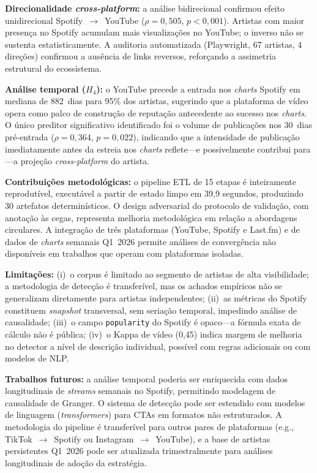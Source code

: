 ﻿\documentclass[12pt]{article}
\begin{document}
\textbf{Direcionalidade \textit{cross-platform}:} a análise bidirecional
confirmou efeito unidirecional Spotify~$\to$~YouTube ($\rho = 0{,}505$,
$p < 0{,}001$). Artistas com maior presença no Spotify acumulam mais
visualizações no YouTube; o inverso não se sustenta estatisticamente. A
auditoria automatizada (Playwright, 67 artistas, 4 direções) confirmou a
ausência de links reversos, reforçando a assimetria estrutural do ecossistema.

\textbf{Análise temporal ($H_4$):} o YouTube precede a entrada nos
\textit{charts} Spotify em mediana de 882~dias para 95\% dos artistas,
sugerindo que a plataforma de vídeo opera como palco de construção de
reputação antecedente ao sucesso nos \textit{charts}. O único preditor
significativo identificado foi o volume de publicações nos 30~dias
pré-entrada ($\rho = 0{,}364$, $p = 0{,}022$), indicando que a intensidade
de publicação imediatamente antes da estreia nos \textit{charts} reflete---e
possivelmente contribui para---a projeção \textit{cross-platform} do artista.

\textbf{Contribuições metodológicas:} o pipeline ETL de 15 etapas é
inteiramente reprodutível, executável a partir de estado limpo em 39,9
segundos, produzindo 30 artefatos determinísticos. O design adversarial do
protocolo de validação, com anotação às cegas, representa melhoria
metodológica em relação a abordagens circulares. A integração de três
plataformas (YouTube, Spotify e Last.fm) e de dados de \textit{charts}
semanais Q1~2026 permite análises de convergência não disponíveis em trabalhos
que operam com plataformas isoladas.

\textbf{Limitações:} (i)~o corpus é limitado ao segmento de artistas de alta
visibilidade; a metodologia de detecção é transferível, mas os achados
empíricos não se generalizam diretamente para artistas independentes;
(ii)~as métricas do Spotify constituem \textit{snapshot} transversal, sem
seriação temporal, impedindo análise de causalidade; (iii)~o campo
\texttt{popularity} do Spotify é opaco---a fórmula exata de cálculo não é
pública; (iv)~o Kappa de vídeo (0,45) indica margem de melhoria no detector
a nível de descrição individual, possível com regras adicionais ou com
modelos de NLP.

\textbf{Trabalhos futuros:} a análise temporal poderia ser enriquecida com
dados longitudinais de \textit{streams} semanais no Spotify, permitindo
modelagem de causalidade de Granger. O sistema de detecção pode ser estendido
com modelos de linguagem (\textit{transformers}) para CTAs em formatos não
estruturados. A metodologia do pipeline é transferível para outros pares de
plataformas (e.g., TikTok~$\to$~Spotify ou Instagram~$\to$~YouTube), e a
base de artistas persistentes Q1~2026 pode ser atualizada trimestralmente
para análises longitudinais de adoção da estratégia.



\end{document}
